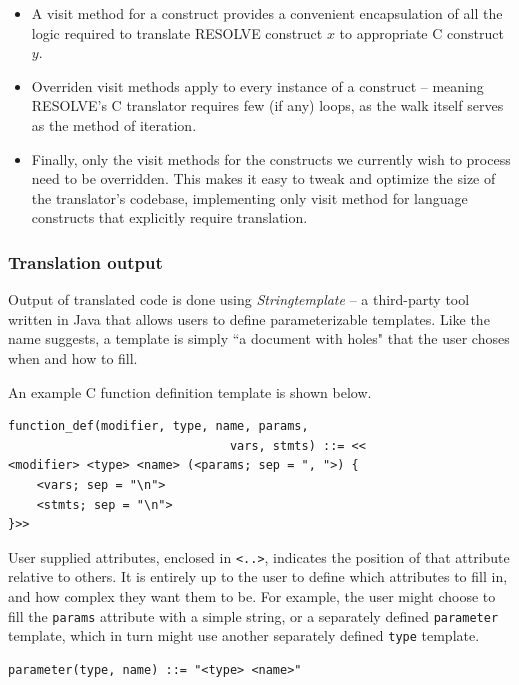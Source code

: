 \documentclass{sig-alternate}
\begin{document}
\begin{itemize}
\item A visit method for a construct provides a convenient encapsulation of all the logic required to translate RESOLVE construct $x$ to appropriate C construct $y$.

\item Overriden visit methods apply to every instance of a construct -- meaning RESOLVE's C translator requires few (if any) loops, as the walk itself serves as the method of iteration.

\item Finally, only the visit methods for the constructs we currently wish to process need to be overridden. This makes it easy to tweak and optimize the size of the translator's codebase, implementing only visit method for language constructs that explicitly require translation.  
\end{itemize}

\subsubsection{Translation output}
Output of translated code is done using \textit{Stringtemplate} -- a third-party tool written in Java that allows users to define parameterizable templates. Like the name suggests, a template is simply ``a document with holes" that the user choses when and how to fill. 

An example C function definition template is shown below.

\begin{verbatim}
function_def(modifier, type, name, params, 
                               vars, stmts) ::= <<
<modifier> <type> <name> (<params; sep = ", ">) {
    <vars; sep = "\n">
    <stmts; sep = "\n">
}>>
\end{verbatim}

User supplied attributes, enclosed in \texttt{<..>}, indicates the position of that attribute relative to others. It is entirely up to the user to define which attributes to fill in, and how complex they want them to be. For example, the user might choose to fill the \texttt{params} attribute with a simple string, or a separately defined \texttt{parameter} template, which in turn might use another separately defined \texttt{type} template.

\begin{verbatim}
parameter(type, name) ::= "<type> <name>"
\end{verbatim}
\end{document}
